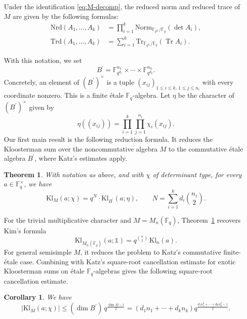 \documentclass[11pt]{amsart}
\renewcommand{\leq}{\leqslant}
\newcommand{\Kl}{\mathrm{Kl}}
\newcommand{\Nrd}{\mathrm{Nrd}}
\newcommand{\Trd}{\mathrm{Trd}}
\newcommand{\Norm}{\mathrm{Norm}}
\newcommand{\Trace}{\mathrm{Tr}}
\newcommand{\chitriv}{\mathbb{1}}
\numberwithin{equation}{section}
\theoremstyle{remark}
\theoremstyle{plain}
\newtheorem{theorem}[equation]{Theorem}
\newtheorem{corollary}[equation]{Corollary}
\theoremstyle{definition}
\begin{document}
Under the identification \eqref{eq:M-decomp}, the reduced norm and
reduced trace of \(M\) are given by the following formulas:
\[
\begin{aligned}
  \Nrd(A_1,\ldots,A_k)
  &=
    \prod_{i=1}^k
    \Norm_{\mathbb{F}_{q^{d_i}}/\mathbb{F}_q}(\det A_i),\\
  \Trd(A_1,\ldots,A_k)
  &=
    \sum_{i=1}^k
    \Trace_{\mathbb{F}_{q^{d_i}}/\mathbb{F}_q}(\operatorname{Tr} A_i).
\end{aligned}
\]

With this notation, we set
\begin{equation}
\label{eq:reduced-algebra}
B^{\prime}=
\mathbb{F}_{q^{d_1}}^{n_1}
\times\cdots\times
\mathbb{F}_{q^{d_k}}^{n_k}.
\end{equation}
Concretely, an element of \((B^{\prime})^\times\) is a tuple
\((x_{ij})_{1\leq i\leq k,\,1\leq j\leq n_i}\) with every coordinate
nonzero.  This is a finite \'etale \(\mathbb{F}_q\)-algebra.  Let
\(\eta\) be the character of \((B^{\prime})^\times\) given by
\begin{equation}
\label{eq:induced-char}
\eta((x_{ij}))=\prod_{i=1}^k\prod_{j=1}^{n_i}\chi_i(x_{ij}).
\end{equation}
Our first main result is the following reduction formula.  It reduces
the Kloosterman sum over the noncommutative algebra \(M\) to the
commutative étale algebra \(B^{\prime}\), where Katz's estimates apply.

\begin{theorem}\label{thm:reduction}
With notation as above, and with \(\chi\) of determinant type, for every
\(a\in\mathbb{F}_q^\times\), we have
\begin{equation*}
\Kl_M(a;\chi)
=
q^{N} \cdot \Kl_{B^{\prime}}(a;\eta),
\qquad
N=\sum_{i=1}^k d_i\binom{n_i}{2}.
\end{equation*}
\end{theorem}

For the trivial multiplicative character and \(M=M_n(\mathbb{F}_q)\),
Theorem~\ref{thm:reduction} recovers Kim's formula \cite{kim}
\[
\Kl_{M_n(\mathbb{F}_q)}(a;\chitriv)
= q^{\binom{n}{2}}\,\Kl_n(a).
\]
For general semisimple \(M\), it reduces the problem to Katz's
commutative finite-\'etale case.  Combining with Katz's square-root
cancellation estimate for exotic Kloosterman sums on \'etale
\(\mathbb{F}_q\)-algebras gives the following square-root cancellation
estimate.



\begin{corollary}\label{cor:bound}
We have
\[
|\Kl_M(a;\chi)|
\leq
(\dim B^{\prime})\, q^{\frac{\dim M-1}2}
=
(d_1n_1 + \cdots + d_k n_k)
q^{\frac{d_1 n_1^2 + \cdots + d_k n_k^2 - 1}2}.
\]
\end{corollary}
\end{document}
